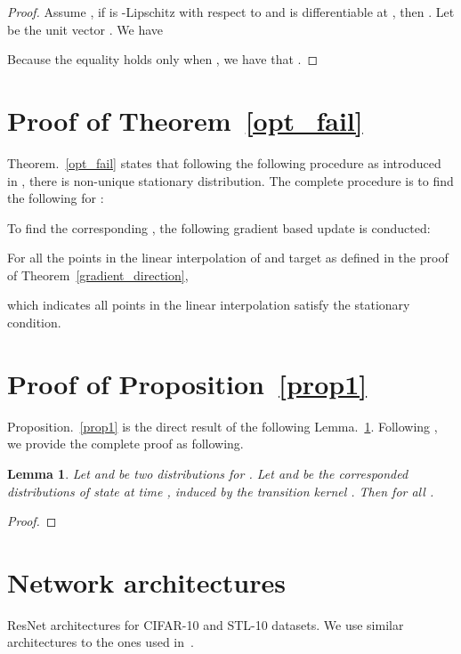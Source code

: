 \documentclass{article}
\newtheorem{lemma}{Lemma}
\begin{document}
\begin{proof}  
Assume , if  is -Lipschitz with respect to  and  is differentiable at , then .  Let  be the unit vector . We have 

Because the equality holds only when , we have that .
\end{proof}



\section{Proof of Theorem~\ref{opt_fail}}\label{proof2}
Theorem.~\ref{opt_fail} states that following the following procedure as introduced in \cite{tanaka2019discriminator}, there is non-unique stationary distribution. The complete procedure is to find the following  for :

To find the corresponding , the following gradient based update is conducted:

For all the points  in the linear interpolation of  and target  as defined in the proof of Theorem~\ref{gradient_direction},

which indicates all points in the linear interpolation  satisfy the stationary condition.



\section{Proof of Proposition~\ref{prop1}}\label{proof3}

Proposition.~\ref{prop1} is the direct result of the following Lemma.~\ref{lem:dd}. Following \cite{li2017approximate}, we provide the complete proof as following.

\begin{lemma}\label{lem:dd}
\cite{cover2012elements}
Let  and  be two distributions for . Let  and  be the corresponded distributions of state  at time , induced by the transition kernel . Then  for all .
\end{lemma}
\begin{proof}

\end{proof}



\section{Network architectures}
\label{app:sec:network-arch}

ResNet architectures for CIFAR-10 and STL-10 datasets. We use similar architectures to the ones used in~\cite{gulrajani2017improved}.
\end{document}
